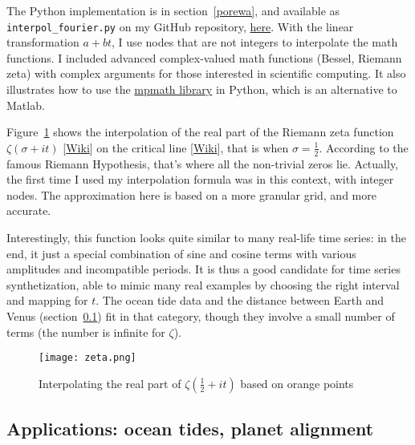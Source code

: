 \documentclass[oneside,10pt]{book}
\begin{document}
The Python implementation is in section~\ref{porewa}, and available as \texttt{interpol\_fourier.py} on my GitHub repository,
\href{https://github.com/VincentGranville/Statistical-Optimization/blob/main/interpol_fourier.py}{ here}. With the linear transformation $a+bt$, I use nodes that are not integers to interpolate the math functions. I included advanced complex-valued math functions (Bessel, Riemann zeta) with complex arguments for those interested in scientific computing. It also illustrates how to use the
\href{https://mpmath.org/}{mpmath library} in Python, which is an alternative to Matlab.

Figure~\ref{fig:zeta} shows the interpolation of the real part of the
\textcolor{index}{Riemann zeta function}
 $\zeta(\sigma +it)$
[\href{https://en.wikipedia.org/wiki/Riemann_zeta_function}{Wiki}] on the
 \textcolor{index}{critical line} [\href{https://en.wikipedia.org/wiki/Riemann_hypothesis#Zeros_on_the_critical_line}{Wiki}], that is when $\sigma=\frac{1}{2}$.
According to the famous \textcolor{index}{Riemann Hypothesis}, that's where all the non-trivial zeros lie.
 Actually, the first time I used my interpolation formula was in this context, with integer nodes. The approximation here is based on a more granular grid, and more accurate.


Interestingly, this function looks quite similar to many real-life time series: in the end, it just a special combination of sine and cosine terms with various amplitudes and incompatible periods. It is thus a good candidate for time series synthetization, able to mimic many real examples by choosing the right interval and mapping for $t$. The ocean tide data and the distance between Earth and Venus (section~\ref{venus}) fit in that category, though they involve
 a small number of terms (the number is infinite for $\zeta$).


\begin{figure}[H]
\centering
\texttt{[image: zeta.png]} %
\caption{Interpolating the real part of $\zeta(\frac{1}{2}+it)$ based on orange points}
\label{fig:zeta}
\end{figure}




\subsection{Applications: ocean tides, planet alignment}\label{venus}
\end{document}
